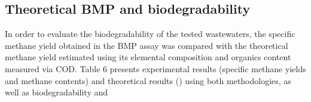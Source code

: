 \subsection{Theoretical BMP and biodegradability}
In order to evaluate the biodegradability of the tested wastewaters, the specific methane yield obtained in the BMP assay was compared with the theoretical methane yield estimated using its elemental composition and organics content measured via COD. Table 6 presents experimental results (specific methane yields and methane contents) and theoretical results () using both methodologies, as well as biodegradability and 

